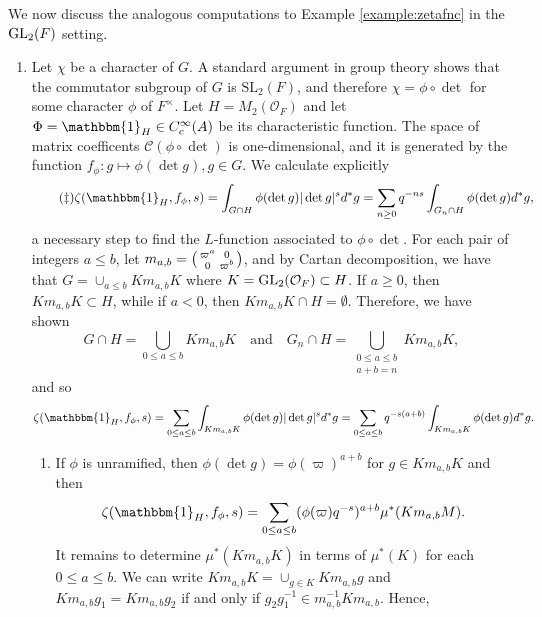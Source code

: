 \begin{example}\label{example:zetafncgl2}
    We now discuss the analogous computations to Example \ref{example:zetafnc} in the $\mathrm{GL}_2(F)$ setting. 
    \begin{enumerate}[(1)]
        \item Let $\chi$ be a character of $G$. A standard argument in group theory shows that the commutator subgroup of $G$ is $\mathrm{SL}_2(F)$, and therefore $\chi=\phi\circ\det$ for some character $\phi$ of $F^\times$. Let $H=M_2(\mathcal{O}_F)$ and let $\Phi=\mathbbm{1}_H\in C_c^\infty(A)$ be its characteristic function. The space of matrix coefficents $\mathcal{C}(\phi\circ\det)$ is one-dimensional, and it is generated by the function $f_\phi:g\mapsto\phi(\det g),g\in G$. We calculate explicitly 
        \begin{equation}\tag{\ddag}\label{eqn:zetagl2}
            \zeta(\mathbbm{1}_H,f_\phi,s)=\int_{G\cap H}\phi(\det g)|\det g|^sd^*g=\sum_{n\geq 0}q^{-ns}\int_{G_n\cap H}\phi(\det g)d^*g,
        \end{equation}
        a necessary step to find the $L$-function associated to $\phi\circ\det$. For each pair of integers $a\leq b$, let $m_{a,b}=\begin{psmallmatrix}
            \varpi^a & 0\\
            0 & \varpi^b\\
        \end{psmallmatrix}$, and by Cartan decomposition, we have that $G=\cup_{a\leq b}K m_{a,b}K$ where $K=\mathrm{GL}_2(\mathcal{O}_F)\subset H$. If $a\geq 0$, then $Km_{a,b}K\subset H$, while if $a<0$, then $Km_{a,b}K\cap H=\emptyset$. Therefore, we have shown 
        $$G\cap H=\bigcup_{0\leq a\leq b}Km_{a,b}K\quad\text{and}\quad G_n\cap H=\bigcup_{\substack{0\leq a\leq b \\ a+b=n}} Km_{a,b}K,$$ and so
        $$\zeta(\mathbbm{1}_H,f_\phi,s)=\sum_{0\leq a\leq b}\int_{Km_{a,b}K}\phi(\det g)|\det g|^sd^*g=\sum_{0\leq a\leq b}q^{-s(a+b)}\int_{Km_{a,b}K}\phi(\det g)d^*g.$$
        \begin{enumerate}
            \item If $\phi$ is unramified, then $\phi(\det g)=\phi(\varpi)^{a+b}$ for $g\in Km_{a,b}K$ and then
            $$\zeta(\mathbbm{1}_H,f_\phi,s)=\sum_{0\leq a\leq b}(\phi(\varpi)q^{-s})^{a+b}\mu^*(Km_{a,b}M).$$
            It remains to determine $\mu^*(Km_{a,b}K)$ in terms of $\mu^*(K)$ for each $0\leq a\leq b$. We can write 
            $Km_{a,b}K=\cup_{g\in K}Km_{a,b}g$
            and $Km_{a,b}g_1=Km_{a,b}g_2$ if and only if $g_2g_1^{-1}\in m_{a,b}^{-1}K m_{a,b}$. Hence,

\end{enumerate}
\end{enumerate}
\end{example}
